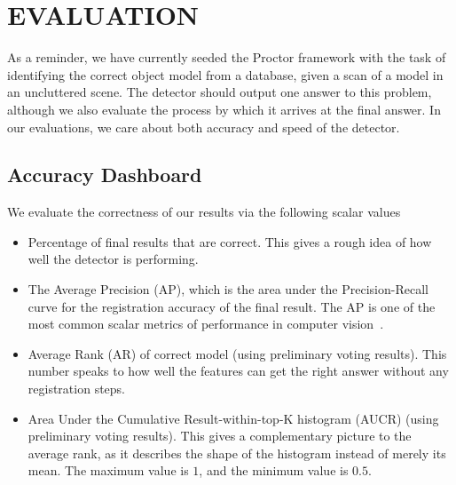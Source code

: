 \section{EVALUATION}

As a reminder, we have currently seeded the Proctor framework with the task of identifying the correct object model from a database, given a scan of a model in an uncluttered scene.
The detector should output one answer to this problem, although we also evaluate the process by which it arrives at the final answer.
In our evaluations, we care about both accuracy and speed of the detector.

\subsection{Accuracy Dashboard}

We evaluate the correctness of our results via the following scalar values
\begin{itemize}
  \item Percentage of final results that are correct. This gives a rough idea of how well the detector is performing.
  \item The Average Precision (AP), which is the area under the Precision-Recall curve for the registration accuracy of the final result. The AP is one of the most common scalar metrics of performance in computer vision~\cite{pascal-voc-2010}.
  \item Average Rank (AR) of correct model (using preliminary voting results). This number speaks to how well the features can get the right answer without any registration steps.
  \item Area Under the Cumulative Result-within-top-K histogram (AUCR) (using preliminary voting results). This gives a complementary picture to the average rank, as it describes the shape of the histogram instead of merely its mean. The maximum value is $1$, and the minimum value is $0.5$.
\end{itemize}

